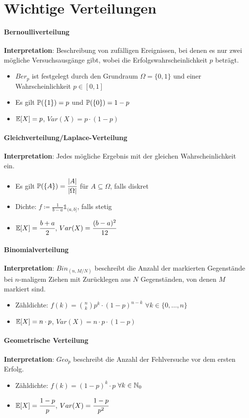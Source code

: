\section{Wichtige Verteilungen}
\paragraph{Bernoulliverteilung}
\textbf{Interpretation}: Beschreibung von zufälligen Ereignissen, bei denen es nur zwei mögliche Versuchsausgänge gibt, wobei die Erfolgswahrscheinlichkeit $p$ beträgt.
\begin{itemize}
	\item $Ber_p$ ist festgelegt durch den Grundraum $\Omega=\{0,1\}$ und einer Wahrscheinlichkeit $p\in[0,1]$
	\item Es gilt $\mathbb{P}(\{1\})=p$ und $\mathbb{P}(\{0\})=1-p$
	\item $\mathbb{E}[X]=p$, $Var(X)=p\cdot(1-p)$
\end{itemize}

\paragraph{Gleichverteilung/Laplace-Verteilung}
\textbf{Interpretation}: Jedes mögliche Ergebnis mit der gleichen Wahrscheinlichkeit ein.
\begin{itemize}
	\item Es gilt $\mathbb{P}(\{A\})=\cfrac{|A|}{|\Omega|}$ für $A\subseteq\Omega$, falls diskret
	\item Dichte: $f\coloneqq\frac{1}{b-a}\mathds{1}_{(a,b]}$, falls stetig
	\item $\mathbb{E}[X]=\cfrac{b+a}{2}$, $Var(X)=\cfrac{(b-a)^2}{12}$
\end{itemize}

\paragraph{Binomialverteilung}
\textbf{Interpretation}: $Bin_{(n,M/N)}$ beschreibt die Anzahl der markierten Gegenstände bei $n$-maligem Ziehen mit Zurücklegen aus $N$ Gegenständen, von denen $M$ markiert sind.
\begin{itemize}
	\item Zähldichte: $f(k)=\binom{n}{k}p^k\cdot(1-p)^{n-k}$ \qquad$\forall k\in\{0,\ldots,n\}$
	\item $\mathbb{E}[X]=n\cdot p$, $Var(X)=n\cdot p\cdot(1-p)$
\end{itemize}

\paragraph{Geometrische Verteilung}
\textbf{Interpretation}: $Geo_p$ beschreibt die Anzahl der Fehlversuche vor dem ersten Erfolg.
\begin{itemize}
	\item Zähldichte: $f(k)=(1-p)^k\cdot p$ \qquad$\forall k\in\mathbb{N}_0$
	\item $\mathbb{E}[X]=\cfrac{1-p}{p}$, $Var(X)=\cfrac{1-p}{p^2}$
\end{itemize}

